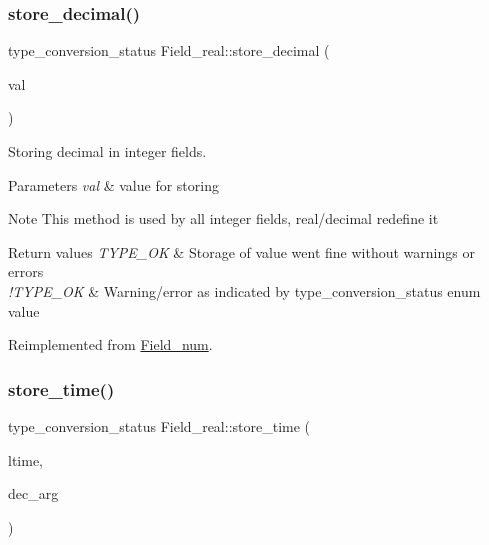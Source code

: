 \subsubsection{\texorpdfstring{store\+\_\+decimal()}{store\_decimal()}}
{\footnotesize\ttfamily type\+\_\+conversion\+\_\+status Field\+\_\+real\+::store\+\_\+decimal (\begin{DoxyParamCaption}\item[{const \mbox{\hyperlink{classmy__decimal}{my\+\_\+decimal}} $\ast$}]{val }\end{DoxyParamCaption})\hspace{0.3cm}{\ttfamily [virtual]}}

Storing decimal in integer fields.


\begin{DoxyParams}{Parameters}
{\em val} & value for storing\\
\hline
\end{DoxyParams}
\begin{DoxyNote}{Note}
This method is used by all integer fields, real/decimal redefine it
\end{DoxyNote}

\begin{DoxyRetVals}{Return values}
{\em T\+Y\+P\+E\+\_\+\+OK} & Storage of value went fine without warnings or errors \\
\hline
{\em !\+T\+Y\+P\+E\+\_\+\+OK} & Warning/error as indicated by type\+\_\+conversion\+\_\+status enum value \\
\hline
\end{DoxyRetVals}


Reimplemented from \mbox{\hyperlink{classField__num_a66573c9ffc227799320c49a73a0f8de5}{Field\+\_\+num}}.

\mbox{\label{classField__real_a2020c5eabc8cdc2c451ca0591e284150}} 
\subsubsection{\texorpdfstring{store\+\_\+time()}{store\_time()}}
{\footnotesize\ttfamily type\+\_\+conversion\+\_\+status Field\+\_\+real\+::store\+\_\+time (\begin{DoxyParamCaption}\item[{M\+Y\+S\+Q\+L\+\_\+\+T\+I\+ME $\ast$}]{ltime,  }\item[{uint8}]{dec\+\_\+arg }\end{DoxyParamCaption})\hspace{0.3cm}{\ttfamily [virtual]}}

